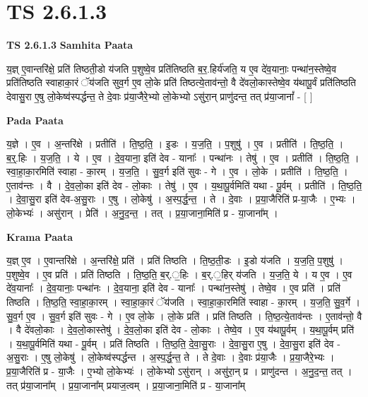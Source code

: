 \documentclass[17pt]{extarticle}
\begin{document}
\section{ TS 2.6.1.3 }

\textbf{TS 2.6.1.3 } \newline
\textbf{Samhita Paata} \newline

य॒ज्ञ् ए॒वान्तरि॑क्षे॒ प्रति॑ तिष्ठती॒डो य॑जति प॒शुष्वे॒व प्रति॑तिष्ठति ब॒र॒.हिर्य॑जति॒ य ए॒व दे॑व॒यानाः॒ पन्था॑न॒स्तेष्वे॒व प्रति॑तिष्ठति स्वाहाका॒रं ॅय॑जति सुव॒र्ग ए॒व लो॒के प्रति॑ तिष्ठत्ये॒ताव॑न्तो॒ वै दे॑वलो॒कास्तेष्वे॒व य॑थापू॒र्वं प्रति॑तिष्ठति देवासु॒रा ए॒षु लो॒केष्व॑स्पर्द्धन्त॒ ते दे॒वाः प्र॑या॒जैरे॒भ्यो लो॒केभ्यो ऽसु॑रा॒न् प्राणु॑दन्त॒ तत् प्र॑या॒जानां᳚ - [  ] \newline

\textbf{Pada Paata} \newline

य॒ज्ञे । ए॒व । अ॒न्तरि॑क्षे । प्रतीति॑ । ति॒ष्ठ॒ति॒ । इ॒डः । य॒ज॒ति॒ । प॒शुषु॑ । ए॒व । प्रतीति॑ । ति॒ष्ठ॒ति॒ । ब॒र्॒.हिः । य॒ज॒ति॒ । ये । ए॒व । दे॒व॒याना॒ इति॑ देव - यानाः᳚ । पन्था॑नः । तेषु॑ । ए॒व । प्रतीति॑ । ति॒ष्ठ॒ति॒ । स्वा॒हा॒का॒रमिति॑ स्वाहा - का॒रम् । य॒ज॒ति॒ । सु॒व॒र्ग इति॑ सुवः - गे । ए॒व । लो॒के । प्रतीति॑ । ति॒ष्ठ॒ति॒ । ए॒ताव॑न्तः । वै । दे॒व॒लो॒का इति॑ देव - लो॒काः । तेषु॑ । ए॒व । य॒था॒पू॒र्वमिति॑ यथा - पू॒र्वम् । प्रतीति॑ । ति॒ष्ठ॒ति॒ । दे॒वा॒सु॒रा इति॑ देव-अ॒सु॒राः । ए॒षु । लो॒केषु॑ । अ॒स्प॒र्द्ध॒न्त॒ । ते । दे॒वाः । प्र॒या॒जैरिति॑ प्र-या॒जैः । ए॒भ्यः । लो॒केभ्यः॑ । असु॑रान् । प्रेति॑ । अ॒नु॒द॒न्त॒ । तत् । प्र॒या॒जाना॒मिति॑ प्र - या॒जाना᳚म् ।  \newline


\textbf{Krama Paata} \newline

य॒ज्ञ् ए॒व । ए॒वान्तरि॑क्षे । अ॒न्तरि॑क्षे॒ प्रति॑ । प्रति॑ तिष्ठति । ति॒ष्ठ॒ती॒डः । इ॒डो य॑जति । य॒ज॒ति॒ प॒शुषु॑ । प॒शुष्वे॒व । ए॒व प्रति॑ । प्रति॑ तिष्ठति । ति॒ष्ठ॒ति॒ ब॒र्.॒हिः । ब॒र्.॒हिर् य॑जति । य॒ज॒ति॒ ये । य ए॒व । ए॒व दे॑व॒यानाः᳚ । दे॒व॒यानाः॒ पन्था॑नः । दे॒व॒याना॒ इति॑ देव - यानाः᳚ । पन्था॑न॒स्तेषु॑ । तेष्वे॒व । ए॒व प्रति॑ । प्रति॑ तिष्ठति । ति॒ष्ठ॒ति॒ स्वा॒हा॒का॒रम् । स्वा॒हा॒का॒रं ॅय॑जति । स्वा॒हा॒का॒रमिति॑ स्वाहा - का॒रम् । य॒ज॒ति॒ सु॒व॒र्गे । सु॒व॒र्ग ए॒व । सु॒व॒र्ग इति॑ सुवः - गे । ए॒व लो॒के । लो॒के प्रति॑ । प्रति॑ तिष्ठति । ति॒ष्ठ॒त्ये॒ताव॑न्तः । ए॒ताव॑न्तो॒ वै । वै दे॑वलो॒काः । दे॒व॒लो॒कास्तेषु॑ । दे॒व॒लो॒का इति॑ देव - लो॒काः । तेष्वे॒व । ए॒व य॑थापू॒र्वम् । य॒था॒पू॒र्वम् प्रति॑ । य॒था॒पू॒र्वमिति॑ यथा - पू॒र्वम् । प्रति॑ तिष्ठति । ति॒ष्ठ॒ति॒ दे॒वा॒सु॒राः । दे॒वा॒सु॒रा ए॒षु । दे॒वा॒सु॒रा इति॑ देव - अ॒सु॒राः । ए॒षु लो॒केषु॑ । लो॒केष्व॑स्पर्द्धन्त । अ॒स्प॒र्द्ध॒न्त॒ ते । ते दे॒वाः । दे॒वाः प्र॑या॒जैः । प्र॒या॒जैरे॒भ्यः । प्र॒या॒जैरिति॑ प्र - या॒जैः । ए॒भ्यो लो॒केभ्यः॑ । लो॒केभ्यो ऽसु॑रान् । असु॑रा॒न् प्र । प्राणु॑दन्त । अ॒नु॒द॒न्त॒ तत् । तत् प्र॑या॒जाना᳚म् । प्र॒या॒जाना᳚म् प्रयाज॒त्वम् । प्र॒या॒जाना॒मिति॑ प्र - या॒जाना᳚म् \newline
\end{document}
